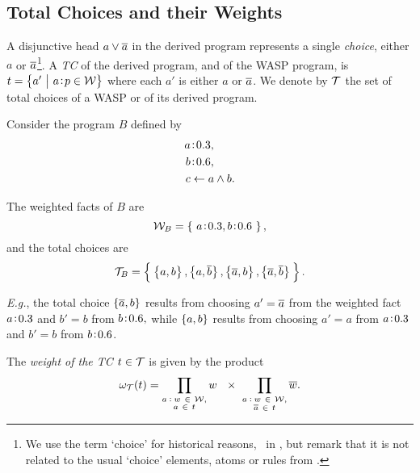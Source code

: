 \documentclass[x11names]{tlp}
\renewcommand{\cite}{\citep}
\begin{document}
\subsection*{Total Choices and their Weights}
\label{ssec:totalchoices.weights}

A disjunctive head $a \vee \overline{a}$ in the derived program represents a single \textit{choice}, either $a$ or $\overline{a}$\footnote{We use the term `choice' for historical reasons, \eg\ in \cite{cozman2020joy}, but remark that it is not related to the usual `choice' elements, atoms or rules from \cite{calimeri2020aspcore}.}.
A \textit{\acl{TC}} of the derived program, and of the \ac{WASP} program, is $t = \set{a' \given
 \weightfact{a}{p} \in \WEIGHTFset}$ where each $a'$ is either $a$ or $\overline{a}$.
We denote by $\TCHOICEset$ the set of total choices of a \ac{WASP} or of its derived program.

\ifExamples
	\begin{example}
		\label{ex:total.choices}\em

		Consider the program $B$ defined by
		\begin{equation*}
			\begin{split}
				\weightfact{a & }{0.3},             %
				\\
				\weightfact{b & }{0.6},             %
				\\
				c           & \clause a \wedge b.
			\end{split}\label{eq:total.choices}
		\end{equation*}

		The weighted facts of $B$ are
		\[ \WEIGHTFset_{B} = \set{~\weightfact{a}{0.3}, \weightfact{b}{0.6}~}, \]
		and the total choices are
		\begin{equation*}
			\TCHOICEset_{B} = \set[2]{\:
				\set[1]{a, b},
				\set[1]{a, \co{b}},
				\set[1]{\co{a}, b},
				\set[1]{\co{a}, \co{b}}\: }.
		\end{equation*}

		\emph{E.g.}, the total choice $\set{\ensuremath{\overline{a}}, b} $ results from choosing $a' =
			\overline{a}$ from the weighted fact $a\!:\!0.3$ and $b' = b$ from
		$b\!:\!0.6, $ while $\set{a, b} $ results from choosing $a' =
			a$ from $a\!:\!0.3$ and $b' = b$ from $b\!:\!0.6$.

	\end{example}
\fi

The \emph{weight of the \acl{TC} $t \in \TCHOICEset$} is given by the product
\begin{equation}
	\wgtT\at{t} =
	\prod_{\substack{
			\weightfact{a~}{~w}~ \in ~\WEIGHTFset,%
	\\
			a~ \in~ t}} w\ \ \times\
	\prod_{\substack{
			\weightfact{a~}{~w}~ \in ~\WEIGHTFset,%
	\\
			\co{a}~\in~ t}} \co{w}.
	\label{eq:prob.total.choice}
\end{equation}
\end{document}
